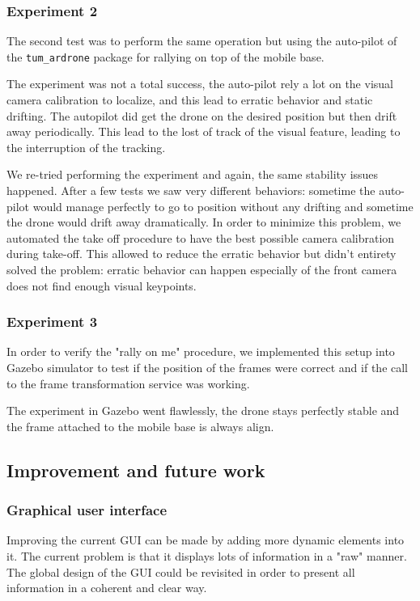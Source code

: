 \documentclass[11pt,a4paper]{article}
\begin{document}
\subsubsection{Experiment 2}
The second test was to perform the same operation but using the auto-pilot of the \verb!tum_ardrone!
package for rallying on top of the mobile base.

The experiment was not a total success, the auto-pilot rely a lot on the visual camera calibration to 
localize, and this lead to erratic behavior and static drifting.
The autopilot did get the drone on the desired position but then drift away periodically. This lead to the 
lost of track of the visual feature, leading to the interruption of the tracking.

We re-tried performing the experiment and again, the same stability issues happened. After a few tests we 
saw very different behaviors: sometime the auto-pilot would manage perfectly to go to position without any
drifting and sometime the drone would drift away dramatically. In order to minimize this problem, we 
automated the take off procedure to have the best possible camera calibration during take-off. This 
allowed to reduce the erratic behavior but didn't entirety solved the problem: erratic behavior can happen
especially of the front camera does not find enough visual keypoints.

\subsubsection{Experiment 3}
In order to verify the "rally on me" procedure, we implemented this setup into Gazebo simulator to test if
the position of the frames were correct and if the call to the frame transformation service was working.

The experiment in Gazebo went flawlessly, the drone stays perfectly stable and the frame attached to the 
mobile base is always align.

\subsection{Improvement and future work}
\subsubsection{Graphical user interface}
Improving the current GUI can be made by adding more dynamic elements into it. The current problem is
that it displays lots of information in a "raw" manner. The global design of the GUI could be revisited in
order to present all information  in a coherent and clear way.
\end{document}
